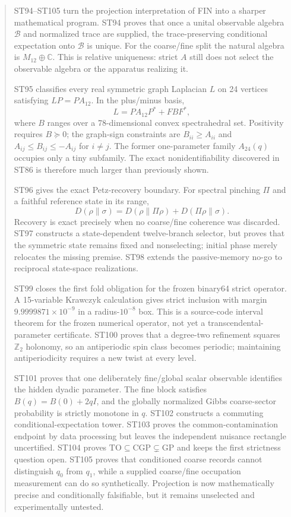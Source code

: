 \documentclass[11pt,a4paper]{article}
\begin{document}
\begin{abstract}
ST94--ST105 turn the projection interpretation of FIN into a sharper mathematical program. ST94 proves that once a unital observable algebra $\mathcal B$ and normalized trace are supplied, the trace-preserving conditional expectation onto $\mathcal B$ is unique. For the coarse/fine split the natural algebra is $M_{12}\oplus\mathbb C$. This is relative uniqueness: strict $A$ still does not select the observable algebra or the apparatus realizing it.

ST95 classifies every real symmetric graph Laplacian $L$ on 24 vertices satisfying $LP=PA_{12}$. In the plus/minus basis,
\[
L=P A_{12}P^*+F B F^*,
\]
where $B$ ranges over a 78-dimensional convex spectrahedral set. Positivity requires $B\succeq0$; the graph-sign constraints are $B_{ii}\ge A_{ii}$ and $A_{ij}\le B_{ij}\le-A_{ij}$ for $i\ne j$. The former one-parameter family $A_{24}(q)$ occupies only a tiny subfamily. The exact nonidentifiability discovered in ST86 is therefore much larger than previously shown.

ST96 gives the exact Petz-recovery boundary. For spectral pinching $\Pi$ and a faithful reference state in its range,
\[
D(\rho\|\sigma)=D(\rho\|\Pi\rho)+D(\Pi\rho\|\sigma).
\]
Recovery is exact precisely when no coarse/fine coherence was discarded. ST97 constructs a state-dependent twelve-branch selector, but proves that the symmetric state remains fixed and nonselecting; initial phase merely relocates the missing premise. ST98 extends the passive-memory no-go to reciprocal state-space realizations.

ST99 closes the first fold obligation for the frozen binary64 strict operator. A 15-variable Krawczyk calculation gives strict inclusion with margin $9.9999871\times10^{-9}$ in a radius-$10^{-8}$ box. This is a source-code interval theorem for the frozen numerical operator, not yet a transcendental-parameter certificate. ST100 proves that a degree-two refinement squares $\mathbb Z_2$ holonomy, so an antiperiodic spin class becomes periodic; maintaining antiperiodicity requires a new twist at every level.

ST101 proves that one deliberately fine/global scalar observable identifies the hidden dyadic parameter. The fine block satisfies $B(q)=B(0)+2qI$, and the globally normalized Gibbs coarse-sector probability is strictly monotone in $q$. ST102 constructs a commuting conditional-expectation tower. ST103 proves the common-contamination endpoint by data processing but leaves the independent nuisance rectangle uncertified. ST104 proves $\mathrm{TO}\subseteq\mathrm{CGP}\subsetneq\mathrm{GP}$ and keeps the first strictness question open. ST105 proves that conditioned coarse records cannot distinguish $q_0$ from $q_1$, while a supplied coarse/fine occupation measurement can do so synthetically. Projection is now mathematically precise and conditionally falsifiable, but it remains unselected and experimentally untested.
\end{abstract}
\end{document}
